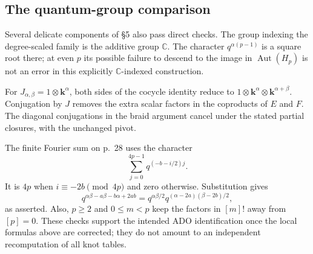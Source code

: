 \documentclass[10pt]{article}
\begin{document}
\subsection*{The quantum-group comparison}
Several delicate components of §5 also pass direct checks. The group indexing the degree-scaled family is the additive group \(\mathbb C\). The character \(q^{\alpha(p-1)}\) is a square root there; at even \(p\) its possible failure to descend to the image in \(\operatorname{Aut}(H_p)\) is not an error in this explicitly \(\mathbb C\)-indexed construction.\par
For \(J_{\alpha,\beta}=1\otimes\mathbf k^\alpha\), both sides of the cocycle identity reduce to \(1\otimes\mathbf k^\alpha\otimes\mathbf k^{\alpha+\beta}\). Conjugation by \(J\) removes the extra scalar factors in the coproducts of \(E\) and \(F\). The diagonal conjugations in the braid argument cancel under the stated partial closures, with the unchanged pivot.\par
The finite Fourier sum on p. 28 uses the character \[\sum_{j=0}^{4p-1}q^{(-b-i/2)j}.\] It is \(4p\) when \(i\equiv-2b\pmod{4p}\) and zero otherwise. Substitution gives \[q^{\alpha\beta-a\beta-b\alpha+2ab}
   =q^{\alpha\beta/2}
      q^{(\alpha-2a)(\beta-2b)/2},\] as asserted. Also, \(p\ge2\) and \(0\le m<p\) keep the factors in \([m]!\) away from \([p]=0\). These checks support the intended ADO identification once the local formulas above are corrected; they do not amount to an independent recomputation of all knot tables.\par
\end{document}
